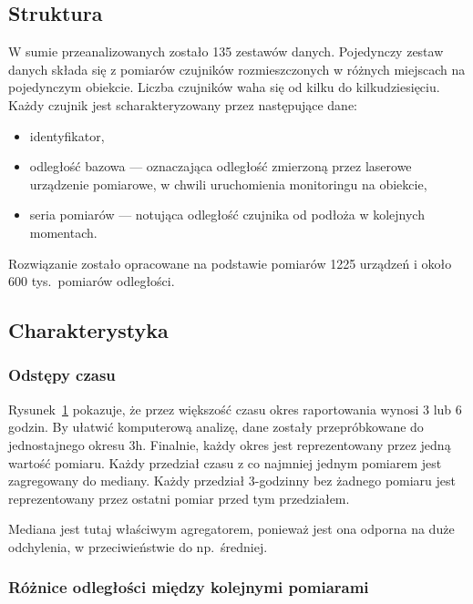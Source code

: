 \subsection{Struktura}\label{subsec:struktura}
W sumie przeanalizowanych zostało 135 zestawów danych.
Pojedynczy zestaw danych składa się z pomiarów czujników rozmieszczonych w różnych miejscach na pojedynczym obiekcie.
Liczba czujników waha się od kilku do kilkudziesięciu.
Każdy czujnik jest scharakteryzowany przez następujące dane:
\begin{itemize}
    \item identyfikator,
    \item odległość bazowa — oznaczająca odległość zmierzoną przez laserowe urządzenie pomiarowe, w chwili uruchomienia monitoringu na obiekcie,
    \item seria pomiarów — notująca odległość czujnika od podłoża w kolejnych momentach.
\end{itemize}
Rozwiązanie zostało opracowane na podstawie pomiarów 1225 urządzeń i około 600 tys.\ pomiarów odległości.

\subsection{Charakterystyka}\label{subsec:charakterystyka}

\subsubsection{Odstępy czasu}
\begin{figure}[h]
    \centering
    
    \label{fig:odstepyczasu}
\end{figure}

Rysunek~\ref{fig:odstepyczasu} pokazuje, że przez większość czasu okres raportowania wynosi 3 lub 6 godzin.
By ułatwić komputerową analizę, dane zostały przepróbkowane do jednostajnego okresu 3h.
Finalnie, każdy okres jest reprezentowany przez jedną wartość pomiaru.
Każdy przedział czasu z co najmniej jednym pomiarem jest zagregowany do mediany.
Każdy przedział 3-godzinny bez żadnego pomiaru jest reprezentowany przez ostatni pomiar przed tym przedziałem.

Mediana jest tutaj właściwym agregatorem, ponieważ jest ona odporna na duże odchylenia, w przeciwieństwie do np.\ średniej.

\subsubsection{Różnice odległości między kolejnymi pomiarami}

